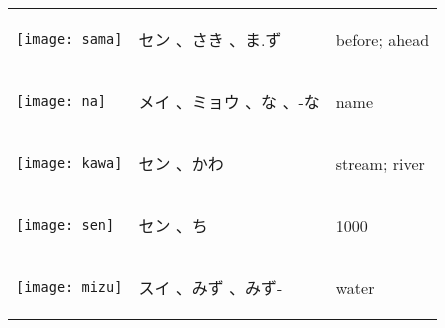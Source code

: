 \documentclass[a4paper,12pt]{extarticle}
\begin{document}
\begin{longtable}{|lp{6cm}p{4cm}|}
\\ 
\begin{minipage}{0.3\textwidth}
\centerline{
	\texttt{[image: sama]}
}
\end{minipage}
&
\begin{CJK}{UTF8}{min} セン 、さき 、ま.ず\end{CJK}
&
 before; ahead
\\ 
\begin{minipage}{0.3\textwidth}
\centerline{
	\texttt{[image: na]}
}
\end{minipage}
&
\begin{CJK}{UTF8}{min}メイ 、ミョウ 、な 、-な\end{CJK}
&
 name
\\ 
\begin{minipage}{0.3\textwidth}
\centerline{
	\texttt{[image: kawa]}
}
\end{minipage}
&
\begin{CJK}{UTF8}{min} セン 、かわ\end{CJK}
&
 stream; river
\\ 
\begin{minipage}{0.3\textwidth}
\centerline{
	\texttt{[image: sen]}
}
\end{minipage}
&
\begin{CJK}{UTF8}{min} セン 、ち\end{CJK}
&
 1000
\\ 
\begin{minipage}{0.3\textwidth}
\centerline{
	\texttt{[image: mizu]}
}
\end{minipage}
&
\begin{CJK}{UTF8}{min} スイ 、みず 、みず-\end{CJK}
&
 water
\\ 

\end{longtable}
\end{document}

